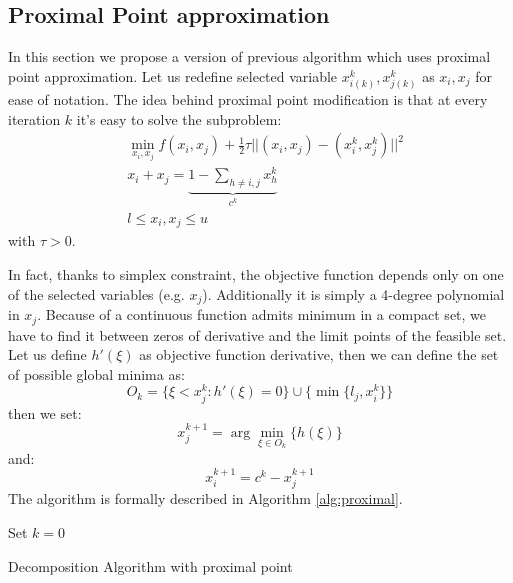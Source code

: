 \subsection{Proximal Point approximation}
In this section we propose a version of previous algorithm which uses proximal point approximation. Let us redefine selected variable $x^k_{i(k)},x^k_{j(k)}$ as $x_{i},x_{j}$ for ease of notation. The idea behind proximal point modification is that at every iteration $k$ it's easy to solve the subproblem:
\begin{align}
 &\min_{x_i,x_j} f(x_i,x_j)+ \frac{1}{2} \tau||(x_i,x_j)-(x_i^k,x_j^k)||^2\\
 &x_i+x_j = \underbrace{1-\sum_{h \ne i,j} x^k_h}_{c^k}\\
 &l \le x_i,x_j\le u
 \end{align}
with $\tau>0$.

In fact, thanks to simplex constraint, the objective function depends only on one of the selected variables (e.g. $x_j$). Additionally it is simply a 4-degree polynomial in $x_j$. Because of a continuous function admits minimum in a compact set, we have to find it between zeros of derivative and the limit points of the feasible set. Let us define $h'(\xi)$ as objective function derivative, then we can define the set of possible global minima as:
\begin{equation}
 O_k = \{ \xi < x_j^k: h'(\xi)=0\} \cup \{\min\{l_j,x_i^k\} \}
\end{equation}
then we set:
\begin{equation}
x_j^{k+1}= \arg \min_{\xi \in O_k} \{h(\xi)\}
\end{equation}
and:
\begin{equation}
x_i^{k+1}= c^{k}-x^{k+1}_j
\end{equation}
The algorithm is formally described in Algorithm \ref{alg:proximal}.
\begin{algorithm}[ht]
 Set $k = 0$\\
 \caption{Decomposition Algorithm with proximal point}
 \label{alg:proximal}
\end{algorithm}

